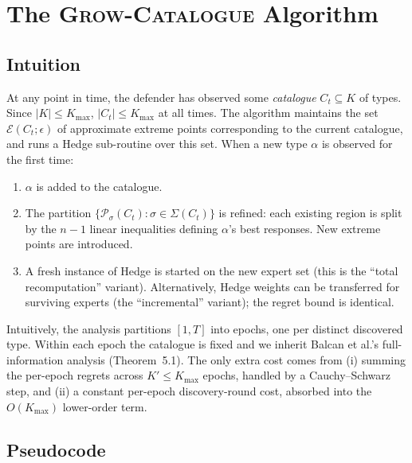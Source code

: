 \documentclass[11pt]{article}
\newcommand{\cE}{\mathcal{E}}
\newcommand{\cP}{\mathcal{P}}
\newcommand{\Kmax}{K_{\max}}
\begin{document}
\section{The \textsc{Grow-Catalogue} Algorithm}
\label{sec:algorithm}

\subsection{Intuition}

At any point in time, the defender has observed some \emph{catalogue} $C_t \subseteq K$ of types. Since $|K|\le \Kmax$, $|C_t|\le \Kmax$ at all times. The algorithm maintains the set $\cE(C_t;\epsilon)$ of approximate extreme points corresponding to the current catalogue, and runs a Hedge sub-routine over this set. When a new type $\alpha$ is observed for the first time:
\begin{enumerate}
  \item $\alpha$ is added to the catalogue.
  \item The partition $\{\cP_\sigma(C_t) : \sigma \in \Sigma(C_t)\}$ is refined: each existing region is split by the $n-1$ linear inequalities defining $\alpha$'s best responses. New extreme points are introduced.
  \item A fresh instance of Hedge is started on the new expert set (this is the ``total recomputation'' variant). Alternatively, Hedge weights can be transferred for surviving experts (the ``incremental'' variant); the regret bound is identical.
\end{enumerate}

Intuitively, the analysis partitions $[1,T]$ into epochs, one per distinct discovered type. Within each epoch the catalogue is fixed and we inherit Balcan et al.'s full-information analysis (Theorem~5.1). The only extra cost comes from (i) summing the per-epoch regrets across $K' \le \Kmax$ epochs, handled by a Cauchy--Schwarz step, and (ii) a constant per-epoch discovery-round cost, absorbed into the $O(\Kmax)$ lower-order term.

\subsection{Pseudocode}
\end{document}
